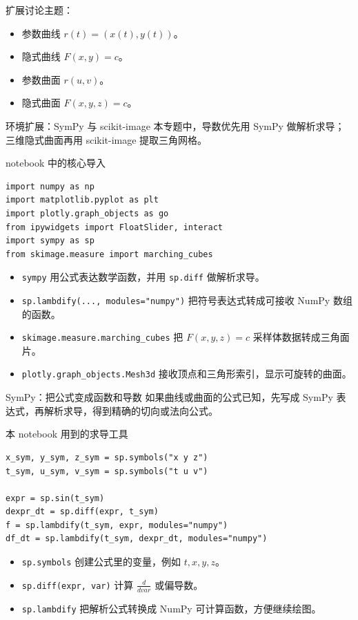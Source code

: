 \documentclass[aspectratio=169,11pt]{ctexbeamer}
\begin{document}
\begin{frame}{扩展讨论主题：}
  \begin{itemize}
    \item 参数曲线 \(r(t)=(x(t),y(t))\)。
    \item 隐式曲线 \(F(x,y)=c\)。
    \item 参数曲面 \(r(u,v)\)。
    \item 隐式曲面 \(F(x,y,z)=c\)。
  \end{itemize}
\end{frame}

\begin{frame}[fragile]{环境扩展：SymPy 与 scikit-image}
  本专题中，导数优先用 SymPy 做解析求导；三维隐式曲面再用 scikit-image 提取三角网格。

  \begin{block}{notebook 中的核心导入}
\begin{Verbatim}[fontsize=\tiny]
import numpy as np
import matplotlib.pyplot as plt
import plotly.graph_objects as go
from ipywidgets import FloatSlider, interact
import sympy as sp
from skimage.measure import marching_cubes
\end{Verbatim}
  \end{block}

  \begin{itemize}
    \item \texttt{sympy} 用公式表达数学函数，并用 \texttt{sp.diff} 做解析求导。
    \item \texttt{sp.lambdify(..., modules="numpy")} 把符号表达式转成可接收 NumPy 数组的函数。
    \item \texttt{skimage.measure.marching\_cubes} 把 \(F(x,y,z)=c\) 采样体数据转成三角面片。
    \item \texttt{plotly.graph\_objects.Mesh3d} 接收顶点和三角形索引，显示可旋转的曲面。
  \end{itemize}
\end{frame}

\begin{frame}[fragile]{SymPy：把公式变成函数和导数}
  如果曲线或曲面的公式已知，先写成 SymPy 表达式，再解析求导，得到精确的切向或法向公式。

  \begin{block}{本 notebook 用到的求导工具}
\begin{Verbatim}[fontsize=\tiny]
x_sym, y_sym, z_sym = sp.symbols("x y z")
t_sym, u_sym, v_sym = sp.symbols("t u v")

expr = sp.sin(t_sym)
dexpr_dt = sp.diff(expr, t_sym)
f = sp.lambdify(t_sym, expr, modules="numpy")
df_dt = sp.lambdify(t_sym, dexpr_dt, modules="numpy")
\end{Verbatim}
  \end{block}

  \begin{itemize}
    \item \texttt{sp.symbols} 创建公式里的变量，例如 \(t,x,y,z\)。
    \item \texttt{sp.diff(expr, var)} 计算 \(\frac{d}{d var}\) 或偏导数。
    \item \texttt{sp.lambdify} 把解析公式转换成 NumPy 可计算函数，方便继续绘图。
  \end{itemize}
\end{frame}
\end{document}
